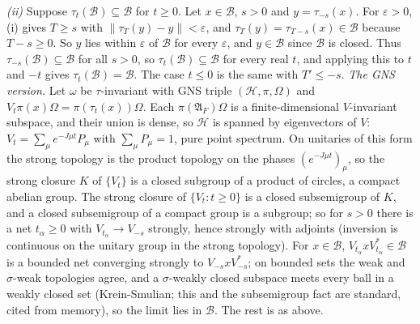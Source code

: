 \emph{(ii)} Suppose $\tau_{t}(\mathcal{B}) \subseteq \mathcal{B}$ for $t \ge 0$. Let $x \in \mathcal{B}$, $s > 0$ and $y = \tau_{-s}(x)$. For $\varepsilon > 0$, (i) gives $T \ge s$ with $\|\tau_{T}(y) - y\| < \varepsilon$, and $\tau_{T}(y) = \tau_{T - s}(x) \in \mathcal{B}$ because $T - s \ge 0$. So $y$ lies within $\varepsilon$ of $\mathcal{B}$ for every $\varepsilon$, and $y \in \mathcal{B}$ since $\mathcal{B}$ is closed. Thus $\tau_{-s}(\mathcal{B}) \subseteq \mathcal{B}$ for all $s > 0$, so $\tau_{t}(\mathcal{B}) \subseteq \mathcal{B}$ for every real $t$, and applying this to $t$ and $-t$ gives $\tau_{t}(\mathcal{B}) = \mathcal{B}$. The case $t \le 0$ is the same with $T' \le -s$. \emph{The GNS version.} Let $\omega$ be $\tau$-invariant with GNS triple $(\mathcal{H}, \pi, \Omega)$ and $V_{t}\pi(x)\Omega = \pi(\tau_{t}(x))\Omega$. Each $\pi(\mathfrak{A}_{F})\Omega$ is a finite-dimensional $V$-invariant subspace, and their union is dense, so $\mathcal{H}$ is spanned by eigenvectors of $V$: $V_{t} = \sum_{\mu}e^{-J\mu t}P_{\mu}$ with $\sum_{\mu}P_{\mu} = 1$, pure point spectrum. On unitaries of this form the strong topology is the product topology on the phases $(e^{-J\mu t})_{\mu}$, so the strong closure $K$ of $\{V_{t}\}$ is a closed subgroup of a product of circles, a compact abelian group. The strong closure of $\{V_{t} : t \ge 0\}$ is a closed subsemigroup of $K$, and a closed subsemigroup of a compact group is a subgroup; so for $s > 0$ there is a net $t_{\alpha} \ge 0$ with $V_{t_{\alpha}} \to V_{-s}$ strongly, hence strongly with adjoints (inversion is continuous on the unitary group in the strong topology). For $x \in \mathcal{B}$, $V_{t_{\alpha}}xV_{t_{\alpha}}^{*} \in \mathcal{B}$ is a bounded net converging strongly to $V_{-s}xV_{-s}^{*}$; on bounded sets the weak and $\sigma$-weak topologies agree, and a $\sigma$-weakly closed subspace meets every ball in a weakly closed set (Krein-Smulian; this and the subsemigroup fact are standard, cited from memory), so the limit lies in $\mathcal{B}$. The rest is as above.

